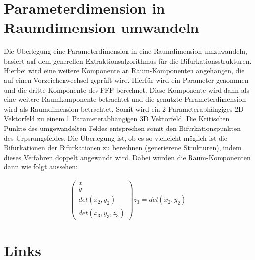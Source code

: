 \documentclass[11pt]{article}
\begin{document}
\section{Parameterdimension in Raumdimension umwandeln}
Die Überlegung eine Parameterdimension in eine Raumdimension umzuwandeln, basiert auf dem generellen Extraktionsalgorithmus für die Bifurkationsstrukturen.
Hierbei wird eine weitere Komponente an Raum-Komponenten angehangen, die auf einen Vorzeichenwechsel geprüft wird.
Hierfür wird ein Parameter genommen und die dritte Komponente des FFF berechnet. Diese Komponente wird dann als eine weitere Raumkomponente betrachtet und die genutzte Parameterdimension wird als Raumdimension betrachtet. Somit wird ein 2 Parameterabhängiges 2D Vektorfeld zu einem 1 Parameterabhängigen 3D Vektorfeld.
Die Kritischen Punkte des umgewandelten Feldes entsprechen somit den Bifurkationspunkten des Urpsrungsfeldes.
Die Überlegung ist, ob es so vielleicht möglich ist die Bifurkationen der Bifurkationen zu berechnen (generierene Strukturen), indem dieses Verfahren doppelt angewandt wird.
Dabei würden die Raum-Komponenten dann wie folgt aussehen:

\begin{align}
	\begin{pmatrix}x\\y\\det(x_2,y_2)\\det(x_3,y_3,z_3)\end{pmatrix}
	z_3 = det(x_2,y_2)
\end{align}

\pagebreak
\section{Links}






\end{document}
